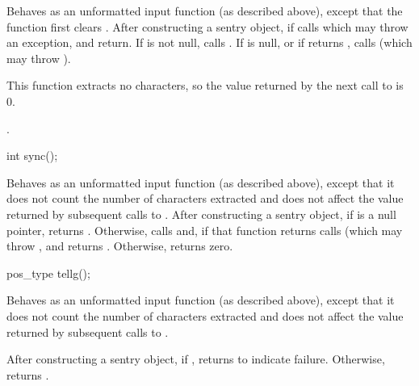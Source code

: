 \begin{itemdescr}
\pnum
\effects
Behaves as an unformatted input function (as described above), except that the function first clears .
After constructing
a sentry object, if
calls
which may throw an exception,
and return.
If
is not null, calls
.
If
is null, or if
returns
,
calls
(which may throw
).
\begin{note}
This
function extracts no characters, so the value returned by the next call to
is 0.
\end{note}

\pnum
\returns
{}.
\end{itemdescr}

%
\begin{itemdecl}
int sync();
\end{itemdecl}

\begin{itemdescr}
\pnum
\effects
Behaves as an unformatted input function (as described above), except that it does not
count the number of characters extracted and does not affect the
value returned by subsequent calls to
.
After constructing
a sentry object, if
is a null pointer, returns .
Otherwise, calls
and, if that function returns 
calls
(which may throw
,
and returns
.
Otherwise, returns zero.
\end{itemdescr}

%
\begin{itemdecl}
pos_type tellg();
\end{itemdecl}

\begin{itemdescr}
\pnum
\effects
Behaves as an unformatted input function (as described above), except that it does not count
the number of characters extracted and does not affect the value
returned by subsequent calls to
.

\pnum
\returns
After constructing a sentry object, if
,
returns
to indicate failure.
Otherwise, returns
.
\end{itemdescr}

